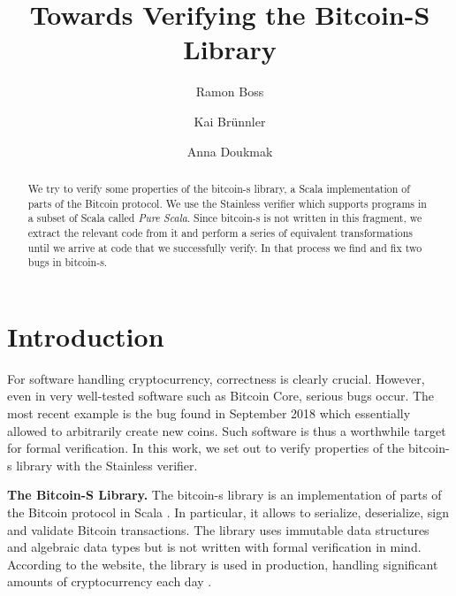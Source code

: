 \documentclass[runningheads]{llncs}
\renewcommand{\paragraph}{\textbf}%
\begin{document}
\title{Towards Verifying the Bitcoin-S Library}

\author{Ramon Boss \and Kai Brünnler \and Anna Doukmak}


\maketitle             

\begin{abstract}
  We try to verify some properties of the bitcoin-s library, a Scala
  implementation of parts of the Bitcoin protocol. We use the
  Stainless verifier which supports programs in a subset of Scala
  called \emph{Pure Scala}.  Since bitcoin-s is not written in this
  fragment, we extract the relevant code from it and perform a series
  of equivalent transformations until we arrive at code that we
  successfully verify. In that process we find and fix two bugs in
  bitcoin-s.

\end{abstract}



\section{Introduction}

For software handling cryptocurrency, correctness is clearly crucial.
However, even in very well-tested software such as Bitcoin Core,
serious bugs occur. The most recent example is the bug found in
September 2018 \cite{cve201817144} which essentially allowed to
arbitrarily create new coins. Such software is thus a worthwhile
target for formal verification. In this work, we set out to verify
properties of the bitcoin-s library with the Stainless verifier.

\paragraph{The Bitcoin-S Library.} The bitcoin-s library is an
implementation of parts of the Bitcoin protocol in Scala
\cite{BitcoinS:website,BitcoinS:github}. In particular, it allows to
serialize, deserialize, sign and validate Bitcoin transactions. The library
uses immutable data structures and algebraic data types but is not
written with formal verification in mind. According to the website,
the library is used in production, handling significant amounts of
cryptocurrency each day \cite{BitcoinS:website}.
\end{document}
